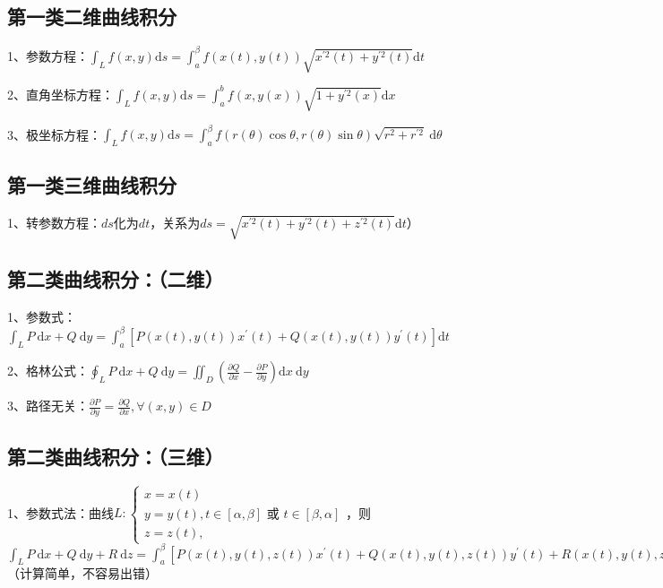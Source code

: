 \subsection{第一类二维曲线积分}

1、参数方程：$\int_{L} f(x, y) \mathrm{d} s=\int_{a}^{\beta} f(x(t), y(t)) \sqrt{x^{\prime 2}(t)+y^{\prime 2}(t)} \mathrm{d} t$

2、直角坐标方程：$\int_{L} f(x, y) \mathrm{d} s=\int_{a}^{b} f(x, y(x)) \sqrt{1+y^{\prime 2}(x)} \mathrm{d} x$

3、极坐标方程：$\int_{L} f(x, y) \mathrm{d} s=\int_{a}^{\beta} f(r(\theta) \cos \theta, r(\theta) \sin \theta) \sqrt{r^{2}+r^{\prime 2}} \mathrm{~d} \theta$



\subsection{第一类三维曲线积分}

1、转参数方程：$ds$化为$dt$，关系为$ds = \sqrt{x^{\prime 2}(t)+y^{\prime 2}(t)+z^{\prime 2}(t)} \mathrm{d} t$）



\subsection{第二类曲线积分：（二维）}

1、参数式：$\int_{L} P \mathrm{~d} x+Q \mathrm{~d} y=\int_{a}^{\beta}\left[P(x(t), y(t)) x^{\prime}(t)+Q(x(t), y(t)) y^{\prime}(t)\right] \mathrm{d} t$

2、格林公式：$\oint_{L} P \mathrm{~d} x+Q \mathrm{~d} y=\iint_{D}\left(\frac{\partial Q}{\partial x}-\frac{\partial P}{\partial y}\right) \mathrm{d} x \mathrm{~d} y$

3、路径无关：$\frac{\partial P}{\partial y}=\frac{\partial Q}{\partial x}, \forall(x, y) \in D$



\subsection{第二类曲线积分：（三维）}

1、参数式法：曲线$L:\left\{\begin{array}{l}x=x(t) \\ y=y(t), t \in[\alpha, \beta] \text { 或 } t \in[\beta, \alpha]\\ z=z(t),\end{array}\right.$，则$\int_{L} P \mathrm{~d} x+Q \mathrm{~d} y+R \mathrm{~d} z= \int_{a}^{\beta}\left[P(x(t), y(t), z(t)) x^{\prime}(t)+Q(x(t), y(t), z(t)) y^{\prime}(t)+R(x(t), y(t), z(t)) z^{\prime}(t)\right] \mathrm{d} t$（计算简单，不容易出错）

